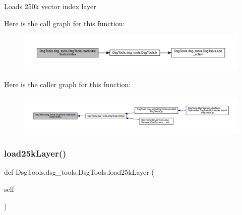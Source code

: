 \begin{DoxyVerb}Loads 250k vector index layer
\end{DoxyVerb}
 Here is the call graph for this function\+:
\nopagebreak
\begin{figure}[H]
\begin{center}
\leavevmode
\includegraphics[width=350pt]{class_dsg_tools_1_1dsg__tools_1_1_dsg_tools_aba2df30d7b3b395706db4c7efe588e11_cgraph}
\end{center}
\end{figure}
Here is the caller graph for this function\+:
\nopagebreak
\begin{figure}[H]
\begin{center}
\leavevmode
\includegraphics[width=350pt]{class_dsg_tools_1_1dsg__tools_1_1_dsg_tools_aba2df30d7b3b395706db4c7efe588e11_icgraph}
\end{center}
\end{figure}
\mbox{\label{class_dsg_tools_1_1dsg__tools_1_1_dsg_tools_adcbf7249e2335d38e00b491002cf0457}} 
\subsubsection{\texorpdfstring{load25k\+Layer()}{load25kLayer()}}
{\footnotesize\ttfamily def Dsg\+Tools.\+dsg\+\_\+tools.\+Dsg\+Tools.\+load25k\+Layer (\begin{DoxyParamCaption}\item[{}]{self }\end{DoxyParamCaption})}

